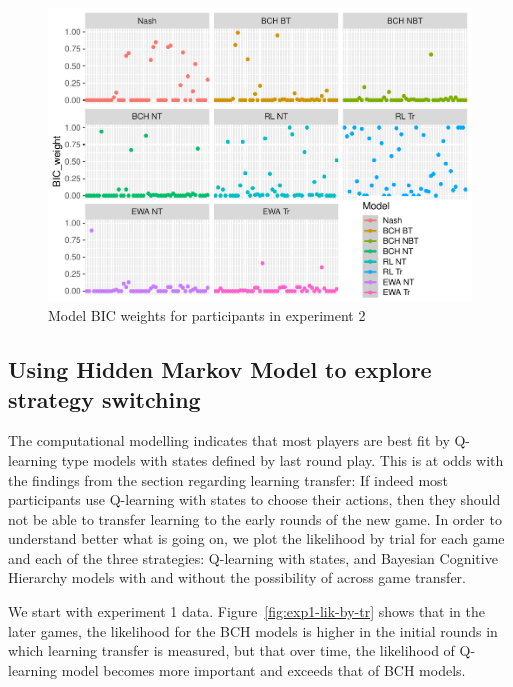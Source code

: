 \documentclass[man,floatsintext]{apa6}
\begin{document}
\begin{figure}

{\centering \includegraphics[width=\textwidth]{paper_draft_2021_files/figure-latex/xp2-BIC-weigths-1} 

}

\caption{Model BIC weights for participants in experiment 2}\label{fig:xp2-BIC-weigths}
\end{figure}

\hypertarget{using-hidden-markov-model-to-explore-strategy-switching}{%
\subsection{Using Hidden Markov Model to explore strategy switching}\label{using-hidden-markov-model-to-explore-strategy-switching}}

The computational modelling indicates that most players are best fit by Q-learning type models with states defined by last round play. This is at odds with the findings from the section regarding learning transfer: If indeed most participants use Q-learning with states to choose their actions, then they should not be able to transfer learning to the early rounds of the new game. In order to understand better what is going on, we plot the likelihood by trial for each game and each of the three strategies: Q-learning with states, and Bayesian Cognitive Hierarchy models with and without the possibility of across game transfer.

We start with experiment 1 data. Figure~\ref{fig:exp1-lik-by-tr} shows that in the later games, the likelihood for the BCH models is higher in the initial rounds in which learning transfer is measured, but that over time, the likelihood of Q-learning model becomes more important and exceeds that of BCH models.
\end{document}
